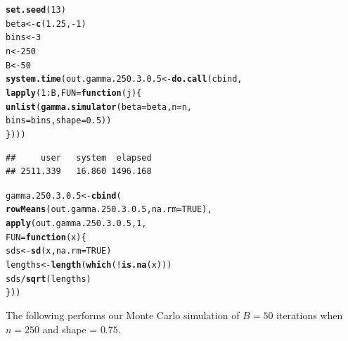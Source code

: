 \documentclass[11pt]{article}\usepackage[]{graphicx}\usepackage[]{color}
\makeatletter
\newcommand{\hlnum}[1]{\textcolor[rgb]{0.686,0.059,0.569}{#1}}%
\newcommand{\hlopt}[1]{\textcolor[rgb]{0,0,0}{#1}}%
\newcommand{\hlstd}[1]{\textcolor[rgb]{0.345,0.345,0.345}{#1}}%
\newcommand{\hlkwa}[1]{\textcolor[rgb]{0.161,0.373,0.58}{\textbf{#1}}}%
\newcommand{\hlkwb}[1]{\textcolor[rgb]{0.69,0.353,0.396}{#1}}%
\newcommand{\hlkwc}[1]{\textcolor[rgb]{0.333,0.667,0.333}{#1}}%
\newcommand{\hlkwd}[1]{\textcolor[rgb]{0.737,0.353,0.396}{\textbf{#1}}}%
\newenvironment{kframe}{%
 \def\at@end@of@kframe{}%
 \ifinner\ifhmode%
  \def\at@end@of@kframe{\end{minipage}}%
  \begin{minipage}{\columnwidth}%
 \fi\fi%
 \def\FrameCommand##1{\hskip\@totalleftmargin \hskip-\fboxsep
 \colorbox{shadecolor}{##1}\hskip-\fboxsep
     \hskip-\linewidth \hskip-\@totalleftmargin \hskip\columnwidth}%
 \MakeFramed {\advance\hsize-\width
   \@totalleftmargin\z@ \linewidth\hsize
   \@setminipage}}%
 {\par\unskip\endMakeFramed%
 \at@end@of@kframe}
\newenvironment{knitrout}{}{} %
\makeatother
\begin{document}
\begin{knitrout}
\color{fgcolor}\begin{kframe}
\begin{alltt}
\hlkwd{set.seed}\hlstd{(}\hlnum{13}\hlstd{)}
\hlstd{beta} \hlkwb{<-} \hlkwd{c}\hlstd{(}\hlnum{1.25}\hlstd{,} \hlopt{-}\hlnum{1}\hlstd{)}
\hlstd{bins} \hlkwb{<-} \hlnum{3}
\hlstd{n} \hlkwb{<-} \hlnum{250}
\hlstd{B} \hlkwb{<-} \hlnum{50}
\hlkwd{system.time}\hlstd{(out.gamma.250.3.0.5} \hlkwb{<-} \hlkwd{do.call}\hlstd{(cbind,}
  \hlkwd{lapply}\hlstd{(}\hlnum{1}\hlopt{:}\hlstd{B,} \hlkwc{FUN} \hlstd{=} \hlkwa{function}\hlstd{(}\hlkwc{j}\hlstd{)\{}
    \hlkwd{unlist}\hlstd{(}\hlkwd{gamma.simulator}\hlstd{(}\hlkwc{beta} \hlstd{= beta,} \hlkwc{n} \hlstd{= n,}
      \hlkwc{bins} \hlstd{= bins,} \hlkwc{shape} \hlstd{=} \hlnum{0.5}\hlstd{))}
\hlstd{\})))}
\end{alltt}
\begin{verbatim}
##     user   system  elapsed 
## 2511.339   16.860 1496.168
\end{verbatim}
\end{kframe}
\end{knitrout}

\begin{knitrout}
\color{fgcolor}\begin{kframe}
\begin{alltt}
\hlstd{gamma.250.3.0.5} \hlkwb{<-} \hlkwd{cbind}\hlstd{(}
  \hlkwd{rowMeans}\hlstd{(out.gamma.250.3.0.5,} \hlkwc{na.rm} \hlstd{=} \hlnum{TRUE}\hlstd{),}
  \hlkwd{apply}\hlstd{(out.gamma.250.3.0.5,} \hlnum{1}\hlstd{,}
  \hlkwc{FUN} \hlstd{=} \hlkwa{function}\hlstd{(}\hlkwc{x}\hlstd{)\{}
    \hlstd{sds} \hlkwb{<-} \hlkwd{sd}\hlstd{(x,} \hlkwc{na.rm} \hlstd{=} \hlnum{TRUE}\hlstd{)}
    \hlstd{lengths} \hlkwb{<-} \hlkwd{length}\hlstd{(}\hlkwd{which}\hlstd{(}\hlopt{!}\hlkwd{is.na}\hlstd{(x)))}
    \hlstd{sds} \hlopt{/} \hlkwd{sqrt}\hlstd{(lengths)}
  \hlstd{\}))}
\end{alltt}
\end{kframe}
\end{knitrout}

The following performs our Monte Carlo simulation of $B = 50$ iterations 
when $n = 250$ and shape = $0.75$.
\end{document}
